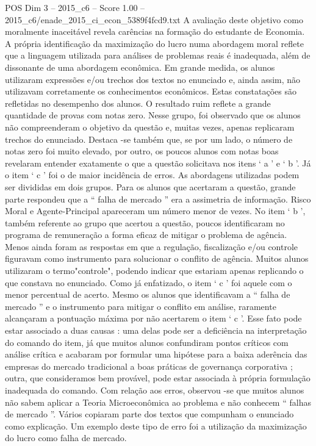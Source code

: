\begin{textsample}{POS Dim 3 – 2015\_c6 – Score 1.00 – 2015\_c6/enade\_2015\_ci\_econ\_5389f4fcd9.txt}
A avaliação deste objetivo como moralmente inaceitável revela carências na formação do estudante de Economia.
A própria identificação da maximização do lucro numa abordagem moral reflete que a linguagem utilizada para análises de problemas reais é inadequada, além de dissonante de uma abordagem econômica.
Em grande medida, os alunos utilizaram expressões e/ou trechos dos textos no enunciado e, ainda assim, não utilizavam corretamente os conhecimentos econômicos.
Estas constatações são refletidas no desempenho dos alunos.
O resultado ruim reflete a grande quantidade de provas com notas zero.
Nesse grupo, foi observado que os alunos não compreenderam o objetivo da questão e, muitas vezes, apenas replicaram trechos do enunciado.
Destaca -se também que, se por um lado, o número de notas zero foi muito elevado, por outro, os poucos alunos com notas boas revelaram entender exatamente o que a questão solicitava nos itens ‘ a ’ e ‘ b ’.
Já o item ‘ c ’ foi o de maior incidência de erros.
As abordagens utilizadas podem ser divididas em dois grupos.
Para os alunos que acertaram a questão, grande parte respondeu que a “ falha de mercado ” era a assimetria de informação.
Risco Moral e Agente-Principal apareceram um número menor de vezes.
No item ‘ b ’, também referente ao grupo que acertou a questão, poucos identificaram no programa de remuneração a forma eficaz de mitigar o problema de agência.
Menos ainda foram as respostas em que a regulação, fiscalização e/ou controle figuravam como instrumento para solucionar o conflito de agência.
Muitos alunos utilizaram o termo"controle", podendo indicar que estariam apenas replicando o que constava no enunciado.
Como já enfatizado, o item ‘ c ’ foi aquele com o menor percentual de acerto.
Mesmo os alunos que identificavam a “ falha de mercado ” e o instrumento para mitigar o conflito em análise, raramente alcançaram a pontuação máxima por não acertarem o item ‘ c ’.
Esse fato pode estar associado a duas causas : uma delas pode ser a deficiência na interpretação do comando do item, já que muitos alunos confundiram pontos críticos com análise crítica e acabaram por formular uma hipótese para a baixa aderência das empresas do mercado tradicional a boas práticas de governança corporativa ; outra, que consideramos bem provável, pode estar associada à própria formulação inadequada do comando.
Com relação aos erros, observou -se que muitos alunos não sabem aplicar a Teoria Microeconômica ao problema e não conhecem “ falhas de mercado ”.
Vários copiaram parte dos textos que compunham o enunciado como explicação.
Um exemplo deste tipo de erro foi a utilização da maximização do lucro como falha de mercado.

\end{textsample}

